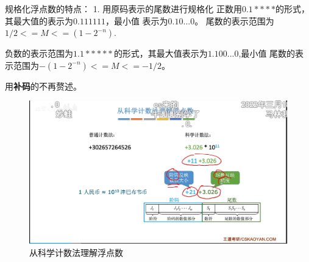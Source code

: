 \documentclass[12pt]{ctexart}
\begin{document}
规格化浮点数的特点：
1. 用原码表示的尾数进行规格化
正数用$0.1 * ***$的形式，其最大值的表示为$0.111111$，最小值
表示为$0.10...0$。
尾数的表示范围为$1/2<=M<=(1-2^{-n})$.

负数的表示范围为$1.1*****$的形式，其最大值表示为$1.100...0$,最小值
尾数的表示范围为$-(1-2^{-n})<=M<=-1/2$。

用\textbf{补码}的不再赘述。
\begin{figure}[htbp]
    \centering
    \includegraphics[scale=0.6]{从科学计数法理解浮点数.png}
    \caption{从科学计数法理解浮点数}
    \end{figure} 
\end{document}
